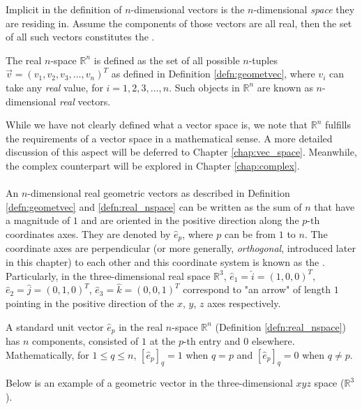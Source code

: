 Implicit in the definition of $n$-dimensional vectors is the $n$-dimensional \textit{space} they are residing in. Assume the components of those vectors are all real, then the set of all such vectors constitutes the .
\begin{defn}
\label{defn:real_nspace}
The real $n$-space $\mathbb{R}^n$ is defined as the set of all possible $n$-tuples $\vec{v} = (v_1, v_2, v_3, \ldots, v_n)^T$ as defined in Definition \ref{defn:geometvec}, where $v_i$ can take any \textit{real} value, for $i = 1,2,3,\ldots,n$. Such objects in $\mathbb{R}^n$ are known as $n$-dimensional \textit{real} vectors.
\end{defn}
While we have not clearly defined what a vector space is, we note that $\mathbb{R}^n$ fulfills the requirements of a vector space in a mathematical sense. A more detailed discussion of this aspect will be deferred to Chapter \ref{chap:vec_space}. Meanwhile, the complex counterpart will be explored in Chapter \ref{chap:complex}.\\
\\
An $n$-dimensional real geometric vectors as described in Definition \ref{defn:geometvec} and \ref{defn:real_nspace} can be written as the sum of $n$  that have a magnitude of $1$ and are oriented in the positive direction along the $p$-th coordinates axes. They are denoted by $\hat{e}_p$, where $p$ can be from $1$ to $n$. The coordinate axes are perpendicular (or more generally, \textit{orthogonal}, introduced later in this chapter) to each other and this coordinate system is known as the . Particularly, in the three-dimensional real space $\mathbb{R}^3$, $\hat{e}_1 = \hat{i} = (1,0,0)^T$, $\hat{e}_2 = \hat{j} = (0,1,0)^T$, $\hat{e}_3 = \hat{k} = (0,0,1)^T$ correspond to "an arrow" of length $1$ pointing in the positive direction of the $x$, $y$, $z$ axes respectively. 
\begin{defn}
\label{defn:standardunitvec}
A standard unit vector $\hat{e}_p$ in the real $n$-space $\mathbb{R}^n$ (Definition \ref{defn:real_nspace}) has $n$ components, consisted of $1$ at the $p$-th entry and $0$ elsewhere. Mathematically, for $1\leq q \leq n$, $[\hat{e}_p]_q = 1$ when $q=p$ and $[\hat{e}_p]_q = 0$ when $q\neq p$.
\end{defn}
Below is an example of a geometric vector in the three-dimensional $xyz$ space ($\mathbb{R}^3$).
